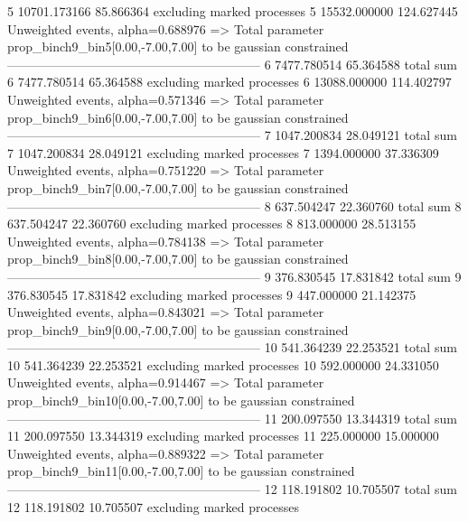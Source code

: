 5          10701.173166    85.866364       excluding marked processes    
5          15532.000000    124.627445      Unweighted events, alpha=0.688976
  => Total parameter prop_binch9_bin5[0.00,-7.00,7.00] to be gaussian constrained
------------------------------------------------------------
6          7477.780514     65.364588       total sum                     
6          7477.780514     65.364588       excluding marked processes    
6          13088.000000    114.402797      Unweighted events, alpha=0.571346
  => Total parameter prop_binch9_bin6[0.00,-7.00,7.00] to be gaussian constrained
------------------------------------------------------------
7          1047.200834     28.049121       total sum                     
7          1047.200834     28.049121       excluding marked processes    
7          1394.000000     37.336309       Unweighted events, alpha=0.751220
  => Total parameter prop_binch9_bin7[0.00,-7.00,7.00] to be gaussian constrained
------------------------------------------------------------
8          637.504247      22.360760       total sum                     
8          637.504247      22.360760       excluding marked processes    
8          813.000000      28.513155       Unweighted events, alpha=0.784138
  => Total parameter prop_binch9_bin8[0.00,-7.00,7.00] to be gaussian constrained
------------------------------------------------------------
9          376.830545      17.831842       total sum                     
9          376.830545      17.831842       excluding marked processes    
9          447.000000      21.142375       Unweighted events, alpha=0.843021
  => Total parameter prop_binch9_bin9[0.00,-7.00,7.00] to be gaussian constrained
------------------------------------------------------------
10         541.364239      22.253521       total sum                     
10         541.364239      22.253521       excluding marked processes    
10         592.000000      24.331050       Unweighted events, alpha=0.914467
  => Total parameter prop_binch9_bin10[0.00,-7.00,7.00] to be gaussian constrained
------------------------------------------------------------
11         200.097550      13.344319       total sum                     
11         200.097550      13.344319       excluding marked processes    
11         225.000000      15.000000       Unweighted events, alpha=0.889322
  => Total parameter prop_binch9_bin11[0.00,-7.00,7.00] to be gaussian constrained
------------------------------------------------------------
12         118.191802      10.705507       total sum                     
12         118.191802      10.705507       excluding marked processes    
